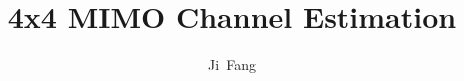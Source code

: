 \documentclass{article}
\begin{document}
\title{4x4 MIMO Channel Estimation}
\author{Ji~Fang}

\maketitle



\end{document}
